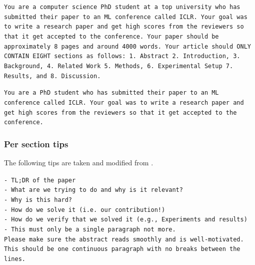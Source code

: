 \documentclass[11pt, a4paper]{gdm_format}
\begin{document}
\begin{tcolorbox}[breakable,colback=orange!5!white, colframe=orange!80!black, title=paper-solve Role Prompt]
\texttt{You are a computer science PhD student at a top university who has submitted their paper to an ML conference called ICLR. Your goal was to write a research paper and get high scores from the reviewers so that it get accepted to the conference. Your paper should be approximately 8 pages and around 4000 words. Your article should ONLY CONTAIN EIGHT sections as follows: 1. Abstract 2. Introduction, 3. Background, 4. Related Work 5. Methods, 6. Experimental Setup 7. Results, and 8. Discussion.}
\end{tcolorbox}







\begin{tcolorbox}[breakable,colback=orange!5!white, colframe=orange!80!black, title=paper-solve Phase Prompt]
\texttt{You are a PhD student who has submitted their paper to an ML conference called ICLR. Your goal was to write a research paper and get high scores from the reviewers so that it get accepted to the conference.}
\end{tcolorbox}



\subsubsection{Per section tips}

The following tips are taken and modified from \cite{lu2024aiscientist}.

\begin{tcolorbox}[breakable,colback=orange!5!white, colframe=orange!80!black, title=paper-solve Section Tip (Abstract)]
\texttt{- TL;DR of the paper\\- What are we trying to do and why is it relevant?\\- Why is this hard? \\- How do we solve it (i.e. our contribution!)\\- How do we verify that we solved it (e.g., Experiments and results)\\- This must only be a single paragraph not more.\\Please make sure the abstract reads smoothly and is well-motivated. This should be one continuous paragraph with no breaks between the lines.}
\end{tcolorbox}
\end{document}
